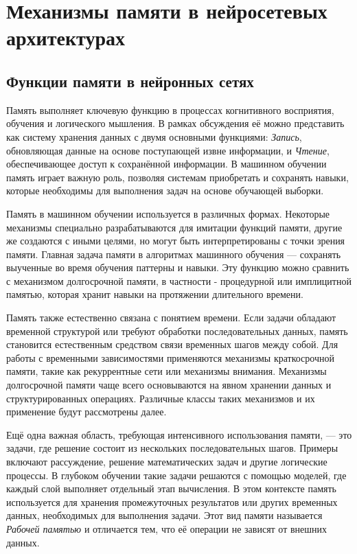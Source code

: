 \chapter{Механизмы памяти в нейросетевых архитектурах}\label{ch:ch1}


\section{Функции памяти в нейронных сетях}\label{sec:ch1/sec1}

Память выполняет ключевую функцию в процессах когнитивного восприятия, обучения и логического мышления. В рамках обсуждения её можно представить как систему хранения данных с двумя основными функциями: \textit{Запись}, обновляющая данные на основе поступающей извне информации, и \textit{Чтение}, обеспечивающее доступ к сохранённой информации. В машинном обучении память играет важную роль, позволяя системам приобретать и сохранять навыки, которые необходимы для выполнения задач на основе обучающей выборки.

Память в машинном обучении используется в различных формах. Некоторые механизмы специально разрабатываются для имитации функций памяти, другие же создаются с иными целями, но могут быть интерпретированы с точки зрения памяти. Главная задача памяти в алгоритмах машинного обучения — сохранять выученные во время обучения паттерны и навыки. Эту функцию можно сравнить с механизмом долгосрочной памяти, в частности - процедурной или имплицитной памятью, которая хранит навыки на протяжении длительного времени.

Память также естественно связана с понятием времени. Если задачи обладают временной структурой или требуют обработки последовательных данных, память становится естественным средством связи временных шагов между собой. Для работы с временными зависимостями применяются механизмы краткосрочной памяти, такие как рекуррентные сети или механизмы внимания. Механизмы долгосрочной памяти чаще всего основываются на явном хранении данных и структурированных операциях. Различные классы таких механизмов и их применение будут рассмотрены далее.

Ещё одна важная область, требующая интенсивного использования памяти, — это задачи, где решение состоит из нескольких последовательных шагов. Примеры включают рассуждение, решение математических задач и другие логические процессы. В глубоком обучении такие задачи решаются с помощью моделей, где каждый слой выполняет отдельный этап вычисления. В этом контексте память используется для хранения промежуточных результатов или других временных данных, необходимых для выполнения задачи. Этот вид памяти называется \textit{Рабочей памятью} и отличается тем, что её операции не зависят от внешних данных.

